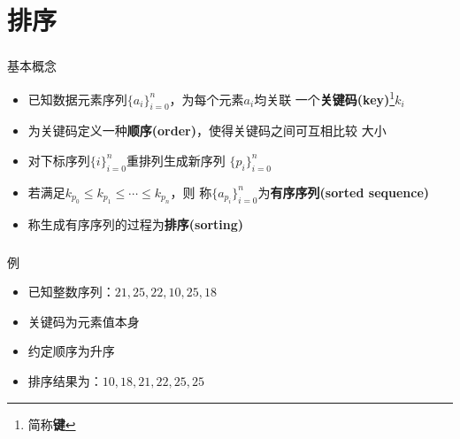 \section{排序}

\begin{frame}
    \frametitle{\insertsectionhead}
    \begin{block}{基本概念}
        \begin{itemize}
            \item 已知数据元素序列$\{a_{i}\}_{i=0}^{n}$，为每个元素$a_{i}$均关联
                  一个\textbf{关键码(key)}\footnote{简称\textbf{键}}$k_{i}$
            \item 为关键码定义一种\textbf{顺序(order)}，使得关键码之间可互相比较
                  大小
            \item 对下标序列$\{i\}_{i=0}^{n}$重\alert{排列}生成新序列
                  $\{p_{i}\}_{i=0}^{n}$
            \item 若满足$k_{p_{0}}\leq{}k_{p_{1}}\leq\cdots\leq{}k_{p_{n}}$，则
                  称$\{a_{p_{i}}\}_{i=0}^{n}$为\textbf{有序序列(sorted
                      sequence)}
            \item 称生成有序序列的过程为\textbf{排序(sorting)}
        \end{itemize}
    \end{block}
\end{frame}

\begin{frame}
    \frametitle{\insertsectionhead}
    \begin{exampleblock}{例}
        \begin{itemize}
            \item 已知整数序列：$21, 25, 22, 10, 25, 18$
            \item \alert{关键码}为元素值本身
            \item 约定\alert{顺序}为升序
            \item 排序结果为：$10, 18, 21, 22, 25, 25$
        \end{itemize}
    \end{exampleblock}
\end{frame}

